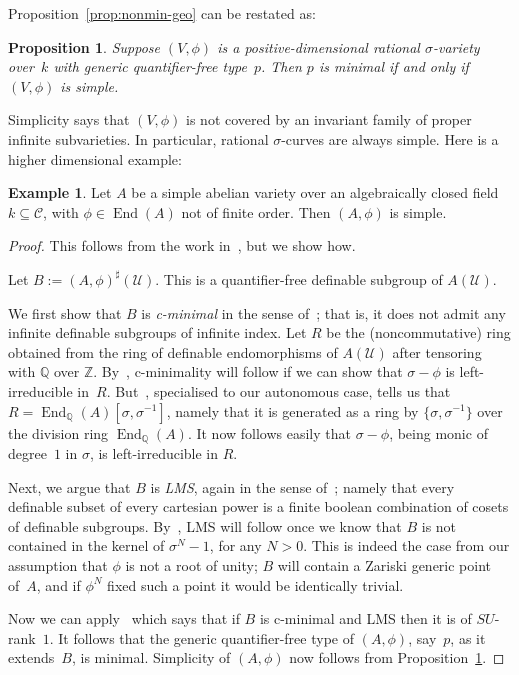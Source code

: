 \documentclass[\DocOpts]{amsart}
\newtheorem{proposition}[theorem]{Proposition}
\theoremstyle{definition}
\newtheorem{example}[theorem]{Example}
\def\endo{\operatorname{End}}
\def\C{\mathcal{C}}
\def\U{\mathcal{U}}
\def\QQ{\mathbb{Q}}
\def\ZZ{\mathbb{Z}}
\newcommand{\<}{\langle}
\renewcommand{\>}{\rangle}
\begin{document}
Proposition~\ref{prop:nonmin-geo} can be restated as:

\begin{proposition}
\label{prop:min-simple}
Suppose $(V,\phi)$ is a positive-dimensional  rational $\sigma$-variety over~$k$ with generic quantifier-free type~$p$.
Then $p$ is minimal if and only if $(V,\phi)$ is simple.
\end{proposition}

Simplicity says that $(V,\phi)$ is not covered by an invariant  family of proper infinite subvarieties.
In particular, rational $\sigma$-curves are always simple.
Here is a higher dimensional example:


\begin{example}
\label{example-sav}
Let $A$ be a simple abelian variety over an algebraically closed field~$k\subseteq\C$, with $\phi\in\endo(A)$ not of finite order.
Then $(A,\phi)$ is simple.
\end{example}

\begin{proof}
This follows from the work in~\cite{mm}, but we show how.

Let $B:=(A,\phi)^\sharp(\U)$.
This is a quantifier-free definable subgroup of $A(\U)$.

We first show that $B$ is \emph{c-minimal} in the sense of~\cite{mm}; that is, it does not admit any infinite definable subgroups of infinite index.
Let $R$ be the (noncommutative) ring obtained from the ring of definable endomorphisms of $A(\U)$ after tensoring with $\QQ$ over $\ZZ$.
By~\cite[Proposition 4.1.1(5)]{mm}, c-minimality will follow if we can show that $\sigma-\phi$ is left-irreducible in~$R$.
But~\cite[Proposition 4.1.1(3)]{mm}, specialised to our autonomous case, tells us that $R=\endo_{\QQ}(A)[\sigma,\sigma^{-1}]$, namely that it is generated as a ring by $\{\sigma,\sigma^{-1}\}$ over the division ring $\endo_{\QQ}(A)$.
It now follows easily that $\sigma-\phi$, being monic of degree~$1$ in $\sigma$, is left-irreducible in $R$.

Next, we argue that $B$ is \emph{LMS}, again in the sense of~\cite{mm}; namely that every definable subset of every cartesian power is a finite boolean combination of cosets of definable subgroups.
By~\cite[Proposition 4.1.2(c)]{mm}, LMS will follow once we know that $B$ is not contained in the kernel of $\sigma^N-1$, for any $N>0$.
This is indeed the case from our assumption that $\phi$ is not a root of unity;
$B$ will contain a Zariski generic point of~$A$, and if $\phi^N$ fixed such a point it would be identically trivial.

Now we can apply~\cite[Proposition 2.1.2(a)]{mm} which says that if $B$ is c-minimal and LMS then it is of $SU$-rank~$1$.
It follows that the generic quantifier-free type of $(A,\phi)$, say~$p$, as it extends~$B$, is minimal.
Simplicity of $(A,\phi)$ now follows from Proposition~\ref{prop:min-simple}.
\end{proof}
\end{document}
